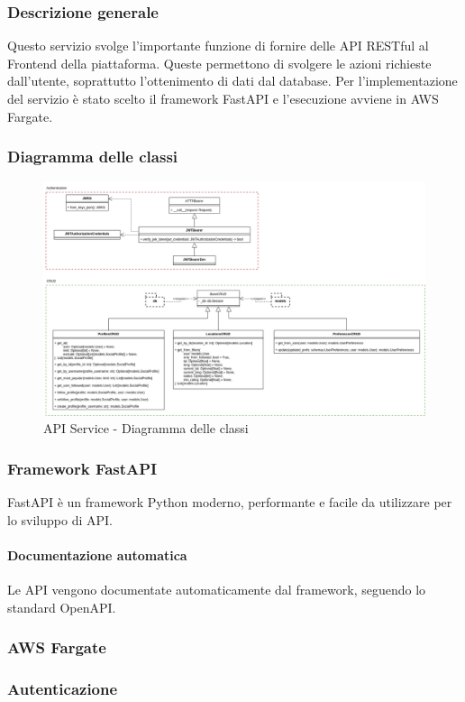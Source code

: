 \subsubsection{Descrizione generale}
Questo servizio svolge l'importante funzione di fornire delle API RESTful al Frontend della piattaforma.
Queste permettono di svolgere le azioni richieste dall'utente, soprattutto l'ottenimento di dati dal database.
Per l'implementazione del servizio è stato scelto il framework FastAPI e l'esecuzione avviene in AWS Fargate.

\subsubsection{Diagramma delle classi}
\begin{figure}[H]
    \includegraphics[width=16cm]{sezioni/images/cd_api.png}
    \centering
    \caption{API Service - Diagramma delle classi}
\end{figure}

\subsubsection{Framework FastAPI}
FastAPI è un framework Python moderno, performante e facile da utilizzare per lo sviluppo di API.

\paragraph{Documentazione automatica}\aCapo
Le API vengono documentate automaticamente dal framework, seguendo lo standard OpenAPI.

\subsubsection{AWS Fargate}

\subsubsection{Autenticazione}
